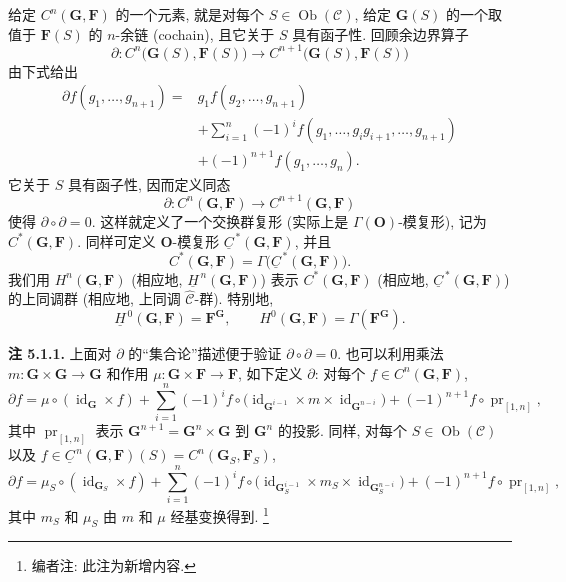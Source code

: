 给定 \(C^n(\mathbf G,\mathbf F)\) 的一个元素, 就是对每个
\(S\in\operatorname{Ob}(\mathscr C)\), 给定 \(\mathbf G(S)\) 的一个取值于
\(\mathbf F(S)\) 的 \(n\)-余链 (cochain), 且它关于 \(S\) 具有函子性.
回顾余边界算子
\[
  \partial:C^n\bigl(\mathbf G(S),\mathbf F(S)\bigr)
    \longrightarrow
    C^{n+1}\bigl(\mathbf G(S),\mathbf F(S)\bigr)
\]
由下式给出
\begin{align*}
  \partial f(g_1,\ldots,g_{n+1})
    ={}&g_1f(g_2,\ldots,g_{n+1}) \\
     &+\sum_{i=1}^{n}(-1)^i
       f(g_1,\ldots,g_i g_{i+1},\ldots,g_{n+1}) \\
     &+(-1)^{n+1}f(g_1,\ldots,g_n).
\end{align*}
它关于 \(S\) 具有函子性, 因而定义同态
\[
  \partial:C^n(\mathbf G,\mathbf F)
    \longrightarrow C^{n+1}(\mathbf G,\mathbf F)
\]
使得 \(\partial\circ\partial=0\). 这样就定义了一个交换群复形
(实际上是 \(\Gamma(\mathbf O)\)-模复形), 记为
\(C^*(\mathbf G,\mathbf F)\). 同样可定义
\(\mathbf O\)-模复形 \(\underline C^{\,*}(\mathbf G,\mathbf F)\), 并且
\[
  C^*(\mathbf G,\mathbf F)
    =\Gamma\bigl(\underline C^{\,*}(\mathbf G,\mathbf F)\bigr).
\]
我们用 \(H^n(\mathbf G,\mathbf F)\) (相应地,
\(\underline H^{\,n}(\mathbf G,\mathbf F)\)) 表示
\(C^*(\mathbf G,\mathbf F)\) (相应地,
\(\underline C^{\,*}(\mathbf G,\mathbf F)\)) 的上同调群
(相应地, 上同调 \(\widehat{\mathscr C}\)-群). 特别地,
\[
  \underline H^{\,0}(\mathbf G,\mathbf F)=\mathbf F^{\mathbf G},
  \qquad
  H^0(\mathbf G,\mathbf F)=\Gamma(\mathbf F^{\mathbf G}).
\]

\medskip
\noindent{}\textbf{注 5.1.1.}
上面对 \(\partial\) 的``集合论''描述便于验证
\(\partial\circ\partial=0\). 也可以利用乘法
\(m:\mathbf G\times\mathbf G\to\mathbf G\) 和作用
\(\mu:\mathbf G\times\mathbf F\to\mathbf F\), 如下定义
\(\partial\): 对每个 \(f\in C^n(\mathbf G,\mathbf F)\),
\[
  \partial f
    =\mu\circ(\operatorname{id}_{\mathbf G}\times f)
     +\sum_{i=1}^{n}(-1)^i
       f\circ
       \bigl(\operatorname{id}_{\mathbf G^{i-1}}\times m\times
             \operatorname{id}_{\mathbf G^{n-i}}\bigr)
     +(-1)^{n+1}f\circ\operatorname{pr}_{[1,n]},
\]
其中 \(\operatorname{pr}_{[1,n]}\) 表示
\(\mathbf G^{n+1}=\mathbf G^n\times\mathbf G\) 到 \(\mathbf G^n\) 的投影.
同样, 对每个 \(S\in\operatorname{Ob}(\mathscr C)\) 以及
\(f\in\underline C^{\,n}(\mathbf G,\mathbf F)(S)
      =C^n(\mathbf G_S,\mathbf F_S)\),
\[
  \partial f
    =\mu_S\circ(\operatorname{id}_{\mathbf G_S}\times f)
     +\sum_{i=1}^{n}(-1)^i
       f\circ
       \bigl(\operatorname{id}_{\mathbf G_S^{i-1}}\times m_S\times
             \operatorname{id}_{\mathbf G_S^{n-i}}\bigr)
     +(-1)^{n+1}f\circ\operatorname{pr}_{[1,n]},
\]
其中 \(m_S\) 和 \(\mu_S\) 由 \(m\) 和 \(\mu\) 经基变换得到.
\footnote{编者注: 此注为新增内容.}

